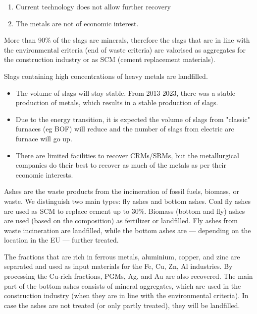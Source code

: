 \begin{enumerate}
  \item Current technology does not allow further recovery
  \item The metals are not of economic interest.
\end{enumerate}

More than 90\% of the slags are minerals, therefore the slags that are in line with the environmental criteria (end of waste criteria) are valorised as aggregates for the construction industry or as SCM (cement replacement materials). 

Slags containing high concentrations of heavy metals are landfilled. 

\begin{itemize}
  \item The volume of slags will stay stable. From 2013-2023, there was a stable production of metals, which results in a stable production of slags.  
  \item Due to the energy transition, it is expected the volume of slags from "classic" furnaces (eg BOF) will reduce and the number of slags from electric arc furnace will go up.
  \item  There are limited facilities to recover CRMs/SRMs, but the metallurgical companies do their best to recover as much of the metals as per their economic interests.
\end{itemize}


Ashes are the waste products from the incineration of fossil fuels, biomass, or waste. We distinguish two main types: fly ashes and bottom ashes. Coal fly ashes are used as SCM to replace cement up to 30\%. Biomass (bottom and fly) ashes are used (based on the composition) as fertilizer or landfilled. Fly ashes from waste incineration are landfilled, while the bottom ashes are --- depending on the location in the EU --- further treated. 

The fractions that are rich in ferrous metals, aluminium, copper, and zinc are separated and used as input materials for the Fe, Cu, Zn, Al industries. By processing the Cu-rich fractions, PGMs, Ag, and Au are also recovered. The main part of the bottom ashes consists of mineral aggregates, which are used in the construction industry (when they are in line with the environmental criteria). In case the ashes are not treated (or only partly treated), they will be landfilled. 


